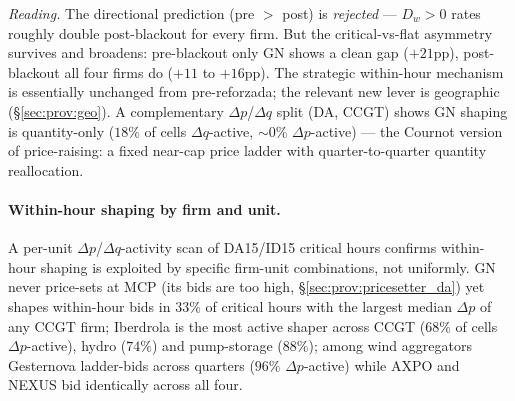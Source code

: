 \documentclass[11pt,a4paper]{article}
\begin{document}
\textit{Reading.} The directional prediction (pre $>$ post) is \emph{rejected} --- $D_w>0$ rates roughly double post-blackout for every firm. But the critical-vs-flat asymmetry survives and broadens: pre-blackout only GN shows a clean gap ($+21$pp), post-blackout all four firms do ($+11$ to $+16$pp). The strategic within-hour mechanism is essentially unchanged from pre-reforzada; the relevant new lever is geographic (\S\ref{sec:prov:geo}). A complementary $\Delta p$/$\Delta q$ split (DA, CCGT) shows GN shaping is quantity-only ($18\%$ of cells $\Delta q$-active, $\sim 0\%$ $\Delta p$-active) --- the Cournot version of price-raising: a fixed near-cap price ladder with quarter-to-quarter quantity reallocation.

\paragraph{Within-hour shaping by firm and unit.} A per-unit $\Delta p$/$\Delta q$-activity scan of DA15/ID15 critical hours confirms within-hour shaping is exploited by specific firm-unit combinations, not uniformly. GN never price-sets at MCP (its bids are too high, \S\ref{sec:prov:pricesetter_da}) yet shapes within-hour bids in $33\%$ of critical hours with the largest median $\Delta p$ of any CCGT firm; Iberdrola is the most active shaper across CCGT ($68\%$ of cells $\Delta p$-active), hydro ($74\%$) and pump-storage ($88\%$); among wind aggregators Gesternova ladder-bids across quarters ($96\%$ $\Delta p$-active) while AXPO and NEXUS bid identically across all four.
\end{document}
